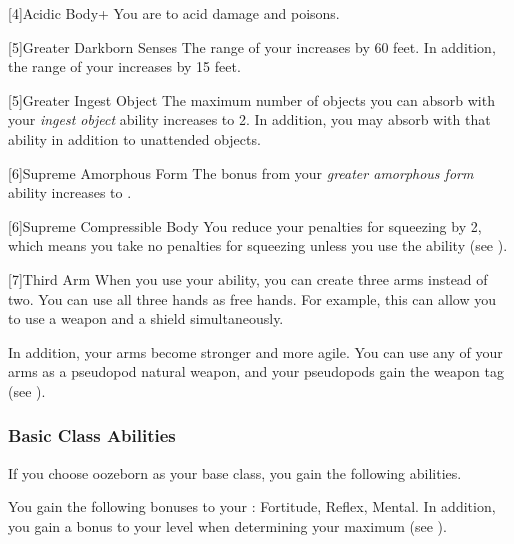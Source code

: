             [4]{Acidic Body+} You are  to acid damage and poisons.

            [5]{Greater Darkborn Senses} The range of your  increases by 60 feet.
            In addition, the range of your  increases by 15 feet.

            [5]{Greater Ingest Object} The maximum number of objects you can absorb with your \textit{ingest object} ability increases to 2.
            In addition, you may absorb  with that ability in addition to unattended objects.

            [6]{Supreme Amorphous Form} The bonus from your \textit{greater amorphous form} ability increases to .

            [6]{Supreme Compressible Body} You reduce your penalties for squeezing by 2, which means you take no penalties for squeezing unless you use the  ability (see ).

            [7]{Third Arm} When you use your  ability, you can create three arms instead of two.
            You can use all three hands as free hands.
            For example, this can allow you to use a  weapon and a shield simultaneously.

            In addition, your arms become stronger and more agile.
            You can use any of your arms as a pseudopod natural weapon, and your pseudopods gain the  weapon tag (see ).

        \subsubsection{Basic Class Abilities}
            If you choose oozeborn as your base class, you gain the following abilities.

            You gain the following bonuses to your :  Fortitude,  Reflex,  Mental.
            In addition, you gain a  bonus to your level when determining your maximum  (see ).

